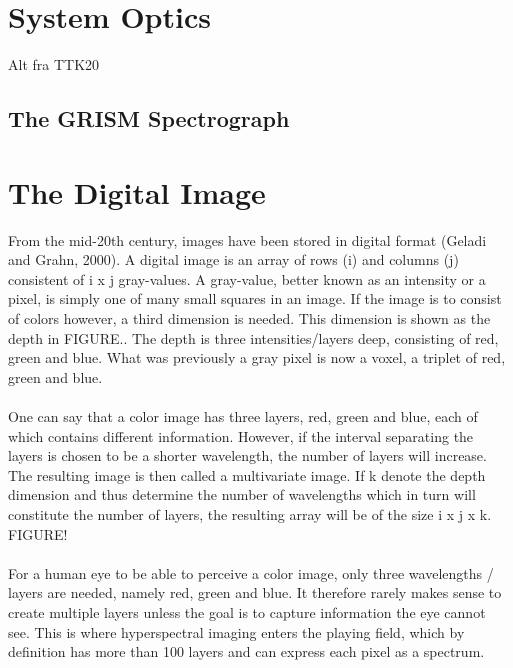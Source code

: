 
\vspace{1.3cm}
\section{System Optics}
Alt fra TTK20
\subsection{The GRISM Spectrograph}


\vspace{1.3cm}
\section{The Digital Image}
From the mid-20th century, images have been stored in digital format (Geladi and Grahn, 2000). A digital image is an array of rows (i) and columns (j) consistent of i x j gray-values. A gray-value, better known as an intensity or a pixel, is simply one of many small squares in an image. If the image is to consist of colors however, a third dimension is needed. This dimension is shown as the depth in FIGURE.. The depth is three intensities/layers deep, consisting of red, green and blue. What was previously a gray pixel is now a voxel, a triplet of red, green and blue.
\\\\
One can say that a color image has three layers, red, green and blue, each of which contains different information. However, if the interval separating the layers is chosen to be a shorter wavelength, the number of layers will increase. The resulting image is then called a multivariate image. If k denote the depth dimension and thus determine the number of wavelengths which in turn will constitute the number of layers, the resulting array will be of the size i x j x k. FIGURE!
\\\\
For a human eye to be able to perceive a color image, only three wavelengths / layers are needed, namely red, green and blue. It therefore rarely makes sense to create multiple layers unless the goal is to capture information the eye cannot see. This is where hyperspectral imaging enters the playing field, which by definition has more than 100 layers and can express each pixel as a spectrum.

